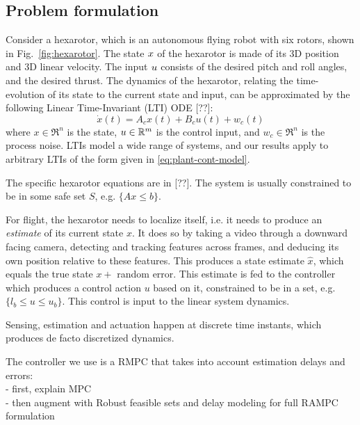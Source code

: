 \subsection{Problem formulation}
\label{formulation}

Consider a hexarotor, which is an autonomous flying robot with six rotors, shown in Fig.~\ref{fig:hexarotor}.
The state $x$ of the hexarotor is made of its 3D position and 3D linear velocity.
The input $u$ consists of the desired pitch and roll angles, and the desired thrust.
The dynamics of the hexarotor, relating the time-evolution of its state to the current state and input, can be approximated by the following Linear Time-Invariant (LTI) ODE [??]:
\begin{equation}
\dot{x}(t)  =A_{c}x(t)+B_{c}u(t)+w_{c}(t)  \label{eq:plant-cont-model}
\end{equation}
where $x\in \Re^{n}$ is the state, $u\in\mathbb{R}^{m}$ is the control input,
and $w_{c}\in\Re^{n}$ is the process noise. 
LTIs model a wide range of systems, and our results apply to arbitrary LTIs of the form given in \eqref{eq:plant-cont-model}.

The specific hexarotor equations are in [??].
The system is usually constrained to be in some safe set $S$, e.g. $\{Ax \leq b\}$.

For flight, the hexarotor needs to localize itself, i.e. it needs to produce an \emph{estimate} of its current state $x$.
It does so by taking a video through a downward facing camera, detecting and tracking features across frames, and deducing its own position relative to these features.
This produces a state estimate $\hat{x}$, which equals the true state $x + $ random error.
This estimate is fed to the controller which produces a control action $u$ based on it, constrained to be in a set, e.g. $\{l_b \leq u \leq u_b\}$.
This control is input to the linear system dynamics.

Sensing, estimation and actuation happen at discrete time instants, which produces de facto discretized dynamics.

The controller we use is a RMPC that takes into account estimation delays and errors: 
\\
- first, explain MPC
\\
- then augment with Robust feasible sets and delay modeling for full RAMPC formulation







